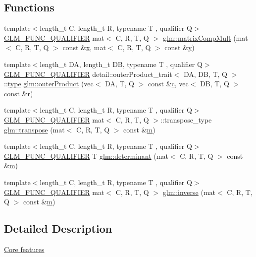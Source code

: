 \subsection*{Functions}
\begin{DoxyCompactItemize}
\item 
{\footnotesize template$<$length\+\_\+t C, length\+\_\+t R, typename T , qualifier Q$>$ }\\\hyperlink{setup_8hpp_a33fdea6f91c5f834105f7415e2a64407}{G\+L\+M\+\_\+\+F\+U\+N\+C\+\_\+\+Q\+U\+A\+L\+I\+F\+I\+ER} mat$<$ C, R, T, Q $>$ \hyperlink{group__core__func__matrix_gaf14569404c779fedca98d0b9b8e58c1f}{glm\+::matrix\+Comp\+Mult} (mat$<$ C, R, T, Q $>$ const \&\hyperlink{_s_d_l__opengl_8h_ad0e63d0edcdbd3d79554076bf309fd47}{x}, mat$<$ C, R, T, Q $>$ const \&\hyperlink{_s_d_l__opengl_8h_a1675d9d7bb68e1657ff028643b4037e3}{y})
\item 
{\footnotesize template$<$length\+\_\+t DA, length\+\_\+t DB, typename T , qualifier Q$>$ }\\\hyperlink{setup_8hpp_a33fdea6f91c5f834105f7415e2a64407}{G\+L\+M\+\_\+\+F\+U\+N\+C\+\_\+\+Q\+U\+A\+L\+I\+F\+I\+ER} detail\+::outer\+Product\+\_\+trait$<$ DA, DB, T, Q $>$\+::\hyperlink{_s_d_l__opengl_8h_ad5ddf6fca7b585646515660e810e0188}{type} \hyperlink{namespaceglm_a0f636d2e7ae0bfb8afe265b73f91f52c}{glm\+::outer\+Product} (vec$<$ DA, T, Q $>$ const \&\hyperlink{_s_d_l__opengl__glext_8h_a1f2d7f8147412c43ba2303a56f97ee73}{c}, vec$<$ DB, T, Q $>$ const \&\hyperlink{_s_d_l__opengl_8h_a42ce7cdc612e53abee15043f80220d97}{r})
\item 
{\footnotesize template$<$length\+\_\+t C, length\+\_\+t R, typename T , qualifier Q$>$ }\\\hyperlink{setup_8hpp_a33fdea6f91c5f834105f7415e2a64407}{G\+L\+M\+\_\+\+F\+U\+N\+C\+\_\+\+Q\+U\+A\+L\+I\+F\+I\+ER} mat$<$ C, R, T, Q $>$\+::transpose\+\_\+type \hyperlink{group__core__func__matrix_gae679d841da8ce9dbcc6c2d454f15bc35}{glm\+::transpose} (mat$<$ C, R, T, Q $>$ const \&\hyperlink{_s_d_l__opengl__glext_8h_af593500c283bf1a787a6f947f503a5c2}{m})
\item 
{\footnotesize template$<$length\+\_\+t C, length\+\_\+t R, typename T , qualifier Q$>$ }\\\hyperlink{setup_8hpp_a33fdea6f91c5f834105f7415e2a64407}{G\+L\+M\+\_\+\+F\+U\+N\+C\+\_\+\+Q\+U\+A\+L\+I\+F\+I\+ER} T \hyperlink{group__core__func__matrix_gad7928795124768e058f99dce270f5c8d}{glm\+::determinant} (mat$<$ C, R, T, Q $>$ const \&\hyperlink{_s_d_l__opengl__glext_8h_af593500c283bf1a787a6f947f503a5c2}{m})
\item 
{\footnotesize template$<$length\+\_\+t C, length\+\_\+t R, typename T , qualifier Q$>$ }\\\hyperlink{setup_8hpp_a33fdea6f91c5f834105f7415e2a64407}{G\+L\+M\+\_\+\+F\+U\+N\+C\+\_\+\+Q\+U\+A\+L\+I\+F\+I\+ER} mat$<$ C, R, T, Q $>$ \hyperlink{group__core__func__matrix_gace61e11fc177491beeca0c6971e2f3fc}{glm\+::inverse} (mat$<$ C, R, T, Q $>$ const \&\hyperlink{_s_d_l__opengl__glext_8h_af593500c283bf1a787a6f947f503a5c2}{m})
\end{DoxyCompactItemize}


\subsection{Detailed Description}
\hyperlink{group__core}{Core features} 
